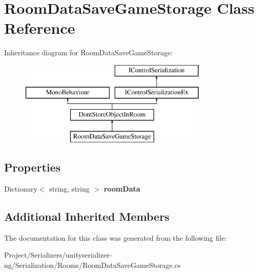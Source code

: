 \hypertarget{class_room_data_save_game_storage}{}\section{Room\+Data\+Save\+Game\+Storage Class Reference}
\label{class_room_data_save_game_storage}
Inheritance diagram for Room\+Data\+Save\+Game\+Storage\+:\begin{figure}[H]
\begin{center}
\leavevmode
\includegraphics[height=4.000000cm]{class_room_data_save_game_storage}
\end{center}
\end{figure}
\subsection*{Properties}
\begin{DoxyCompactItemize}
\item 
\mbox{\label{class_room_data_save_game_storage_a8fef019936e425c2566191550c4aab93}} 
Dictionary$<$ string, string $>$ {\bfseries room\+Data}
\end{DoxyCompactItemize}
\subsection*{Additional Inherited Members}


The documentation for this class was generated from the following file\+:\begin{DoxyCompactItemize}
\item 
Project/\+Serializers/unityserializer-\/ng/\+Serialization/\+Rooms/Room\+Data\+Save\+Game\+Storage.\+cs\end{DoxyCompactItemize}
